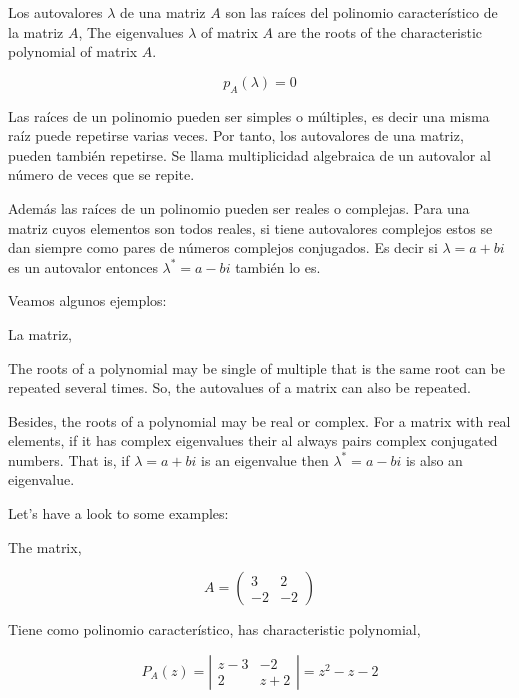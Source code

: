 \begin{paracol}{2}
Los autovalores $\lambda$ de una matriz $A$ son las raíces del polinomio característico de la matriz $A$,
\switchcolumn
The eigenvalues $\lambda$ of matrix $A$ are the roots of the  characteristic polynomial of matrix $A$.
\end{paracol}
\begin{equation*}
p_A(\lambda)=0
\end{equation*}
\begin{paracol}{2}
Las raíces de un polinomio pueden ser simples o múltiples, es decir una misma raíz puede repetirse varias veces. Por tanto, los autovalores de una matriz, pueden también repetirse. Se llama multiplicidad algebraica de un autovalor al número de veces que se repite.

Además las raíces de un polinomio pueden ser reales o complejas. Para una matriz cuyos elementos son todos reales, si tiene autovalores complejos estos se dan siempre como pares de números complejos conjugados. Es decir si $\lambda =a+bi$ es un autovalor entonces $\lambda^*=a-bi$ también lo es.

Veamos algunos ejemplos:

La matriz,

\switchcolumn
The roots of a polynomial may be single of multiple that is the same root can be repeated several times. So, the autovalues of a matrix can also be repeated.

Besides, the roots of a polynomial may be real or complex. For a matrix with real elements, if it has complex eigenvalues their al always pairs complex conjugated numbers. That is, if $\lambda =a+bi$ is an eigenvalue then $\lambda^*=a-bi$ is also an eigenvalue.

Let's have a look to some examples:

The matrix, 
\end{paracol}
\begin{equation*}
A=\begin{pmatrix}
3& 2\\
-2& -2
\end{pmatrix}
\end{equation*}
\begin{paracol}{2}
Tiene como polinomio característico,
\switchcolumn
has characteristic polynomial, 
\end{paracol}
\begin{equation*}
P_A(z)=\left\vert\begin{matrix}
z-3& -2\\
2& z+2 
\end{matrix} \right\vert=z^2-z-2
\end{equation*}
